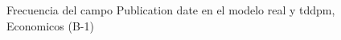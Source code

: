 \begin{figure}[H]
    \centering
    
    \caption{Frecuencia del campo Publication date en el modelo real y tddpm, Economicos (B-1)}
    \label{frecuency-Publication Date-tddpm_mlp}
\end{figure}